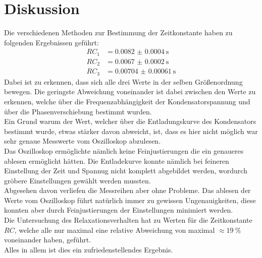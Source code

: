 \newpage
\section{Diskussion}

Die verschiedenen Methoden zur Bestimmung der Zeitkonstante haben zu folgenden Ergebnissen geführt:
\begin{align*}
    RC_1&= \SI{0.0082(4)}{\second} \\
    RC_2&=\SI{0.0067(2)}{\second}\\
    RC_3&=\SI{0.00704(61)}{\second}
\end{align*}
Dabei ist zu erkennen, dass sich alle drei Werte in der selben Größenordnung bewegen.
Die geringste Abweichung voneinander ist dabei zwischen den Werte zu erkennen, welche über die Frequenzabhängigkeit der Kondensatorspannung und über die Phasenverschiebung bestimmt wurden.\\
Ein Grund warum der Wert, welcher über die Entladungskurve des Kondensators bestimmt wurde, etwas stärker davon abweicht, ist, dass es hier nicht möglich war sehr genaue Messwerte vom Oszilloskop abzulesen.\\
Das Oszilloskop ermöglichte nämlich keine Feinjustierungen die ein genaueres ablesen ermöglicht hätten. 
Die Entladekurve konnte nämlich bei feineren Einstellung der Zeit und Spannug nicht komplett abgebildet werden, wordurch gröbere Einstellungen gewählt werden mussten.\\
Abgesehen davon verliefen die Messreihen aber ohne Probleme. Das ablesen der Werte vom Oszilloskop führt natürlich immer zu gewissen Ungenauigkeiten, diese konnten aber durch Feinjustierungen der Einstellungen minimiert werden.\\
Die Untersuchung des Relaxationsverhalten hat zu Werten für die Zeitkonstante $RC$, welche alle nur maximal eine relative Abweichung von maximal $\approx \SI{19}{\percent}$ voneinander haben, geführt.\\
Alles in allem ist dies ein zufriedenstellendes Ergebnis.